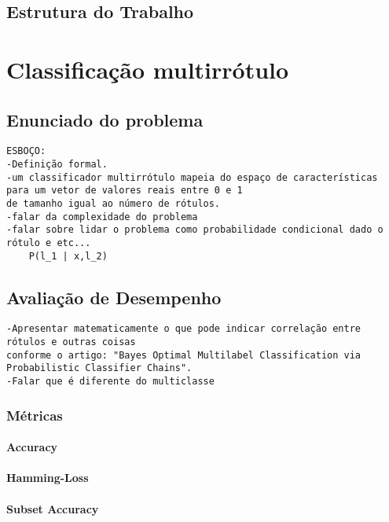 \section{Estrutura do Trabalho}

\chapter{Classificação multirrótulo}

\section{Enunciado do problema}
\begin{verbatim}
ESBOÇO:
-Definição formal.
-um classificador multirrótulo mapeia do espaço de características
para um vetor de valores reais entre 0 e 1 
de tamanho igual ao número de rótulos.
-falar da complexidade do problema
-falar sobre lidar o problema como probabilidade condicional dado o rótulo e etc...
    P(l_1 | x,l_2)
\end{verbatim}



\section{Avaliação de Desempenho}
\begin{verbatim}
-Apresentar matematicamente o que pode indicar correlação entre rótulos e outras coisas
conforme o artigo: "Bayes Optimal Multilabel Classification via Probabilistic Classifier Chains".
-Falar que é diferente do multiclasse
\end{verbatim}
\subsection{Métricas}
\label{sec:metrics}
\subsubsection{Accuracy}
\subsubsection{Hamming-Loss}
\subsubsection{Subset Accuracy}
